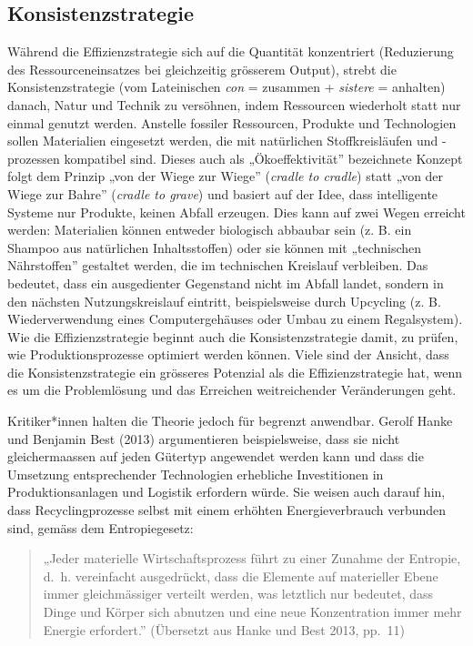 \documentclass[
  nswissgerman,
  a4paper,
  openany]{book}
\begin{document}
\subsection{Konsistenzstrategie}\label{konsistenzstrategie}

Während die Effizienzstrategie sich auf die Quantität konzentriert
(Reduzierung des Ressourceneinsatzes bei gleichzeitig grösserem Output),
strebt die Konsistenzstrategie (vom Lateinischen \emph{con} = zusammen +
\emph{sistere} = anhalten) danach, Natur und Technik zu versöhnen, indem
Ressourcen wiederholt statt nur einmal genutzt werden. Anstelle fossiler
Ressourcen, Produkte und Technologien sollen Materialien eingesetzt
werden, die mit natürlichen Stoffkreisläufen und -prozessen kompatibel
sind. Dieses auch als „Ökoeffektivität'' bezeichnete Konzept folgt dem
Prinzip „von der Wiege zur Wiege'' (\emph{cradle to cradle}) statt „von
der Wiege zur Bahre'' (\emph{cradle to grave}) und basiert auf der Idee,
dass intelligente Systeme nur Produkte, keinen Abfall erzeugen. Dies
kann auf zwei Wegen erreicht werden: Materialien können entweder
biologisch abbaubar sein (z. B. ein Shampoo aus natürlichen
Inhaltsstoffen) oder sie können mit „technischen Nährstoffen'' gestaltet
werden, die im technischen Kreislauf verbleiben. Das bedeutet, dass ein
ausgedienter Gegenstand nicht im Abfall landet, sondern in den nächsten
Nutzungskreislauf eintritt, beispielsweise durch Upcycling (z. B.
Wiederverwendung eines Computergehäuses oder Umbau zu einem
Regalsystem). Wie die Effizienzstrategie beginnt auch die
Konsistenzstrategie damit, zu prüfen, wie Produktionsprozesse optimiert
werden können. Viele sind der Ansicht, dass die Konsistenzstrategie ein
grösseres Potenzial als die Effizienzstrategie hat, wenn es um die
Problemlösung und das Erreichen weitreichender Veränderungen geht.

Kritiker*innen halten die Theorie jedoch für begrenzt anwendbar. Gerolf
Hanke und Benjamin Best (2013) argumentieren beispielsweise, dass sie
nicht gleichermaassen auf jeden Gütertyp angewendet werden kann und dass
die Umsetzung entsprechender Technologien erhebliche Investitionen in
Produktionsanlagen und Logistik erfordern würde. Sie weisen auch darauf
hin, dass Recyclingprozesse selbst mit einem erhöhten Energieverbrauch
verbunden sind, gemäss dem Entropiegesetz:

\begin{quote}
„Jeder materielle Wirtschaftsprozess führt zu einer Zunahme der
Entropie, d.~h. vereinfacht ausgedrückt, dass die Elemente auf
materieller Ebene immer gleichmässiger verteilt werden, was letztlich
nur bedeutet, dass Dinge und Körper sich abnutzen und eine neue
Konzentration immer mehr Energie erfordert.'' (Übersetzt aus Hanke und
Best 2013, pp.~11)
\end{quote}
\end{document}
